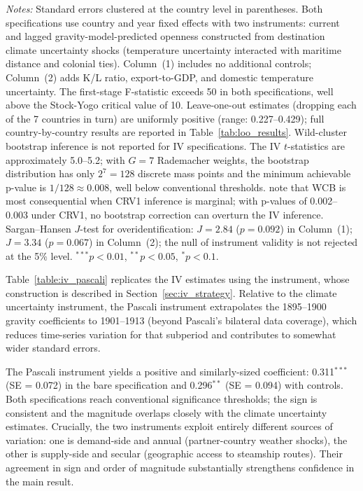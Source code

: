 \documentclass[10pt]{article}
\begin{document}
\begin{table}[!htbp]
\begin{minipage}{\textwidth}
  \textit{Notes:} Standard errors clustered at the country level in parentheses. Both specifications use country and year fixed effects with two instruments: current and lagged gravity-model-predicted openness constructed from destination climate uncertainty shocks (temperature uncertainty interacted with maritime distance and colonial ties). Column~(1) includes no additional controls; Column~(2) adds K/L ratio, export-to-GDP, and domestic temperature uncertainty. The first-stage F-statistic exceeds 50 in both specifications, well above the Stock-Yogo critical value of 10. Leave-one-out estimates (dropping each of the 7 countries in turn) are uniformly positive (range: 0.227--0.429); full country-by-country results are reported in Table~\ref{tab:loo_results}. Wild-cluster bootstrap inference is not reported for IV specifications. The IV $t$-statistics are approximately 5.0--5.2; with $G=7$ Rademacher weights, the bootstrap distribution has only $2^7=128$ discrete mass points and the minimum achievable p-value is $1/128 \approx 0.008$, well below conventional thresholds. \citet{cameronmillerguide2015} note that WCB is most consequential when CRV1 inference is marginal; with p-values of 0.002--0.003 under CRV1, no bootstrap correction can overturn the IV inference. Sargan--Hansen $J$-test for overidentification: $J=2.84$ ($p=0.092$) in Column~(1); $J=3.34$ ($p=0.067$) in Column~(2); the null of instrument validity is not rejected at the 5\% level. $^{***}p<0.01$, $^{**}p<0.05$, $^{*}p<0.1$.
  \end{minipage}
\end{table}

\par Table~\ref{table:iv_pascali} replicates the IV estimates using the \citet{Pascali2017} instrument, whose construction is described in Section~\ref{sec:iv_strategy}. Relative to the climate uncertainty instrument, the Pascali instrument extrapolates the 1895--1900 gravity coefficients to 1901--1913 (beyond Pascali's bilateral data coverage), which reduces time-series variation for that subperiod and contributes to somewhat wider standard errors.

\par The Pascali instrument yields a positive and similarly-sized coefficient: 0.311$^{***}$ (SE = 0.072) in the bare specification and 0.296$^{**}$ (SE = 0.094) with controls. Both specifications reach conventional significance thresholds; the sign is consistent and the magnitude overlaps closely with the climate uncertainty estimates. Crucially, the two instruments exploit entirely different sources of variation: one is demand-side and annual (partner-country weather shocks), the other is supply-side and secular (geographic access to steamship routes). Their agreement in sign and order of magnitude substantially strengthens confidence in the main result.
\end{document}
